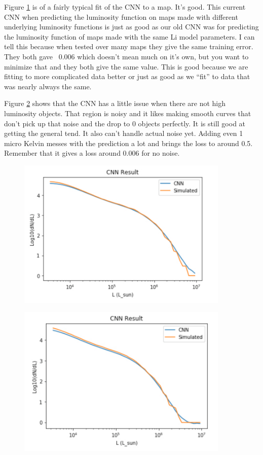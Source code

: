 \documentclass{article}
\begin{document}
		Figure \ref{fig:adam_good} is of a fairly typical fit of the CNN to a map.  It’s good.  This current CNN when predicting the luminosity function on maps made with different underlying luminosity functions is just as good as our old CNN was for predicting the luminosity function of maps made with the same Li model parameters.  I can tell this because when tested over many maps they give the same training error.  They both gave ~0.006 which doesn’t mean much on it’s own, but you want to minimize that and they both give the same value.  This is good because we are fitting to more complicated data better or just as good as we “fit” to data that was nearly always the same.

		Figure \ref{fig:adam_good_2} shows that the CNN has a little issue when there are not high luminosity objects.  That region is noisy and it likes making smooth curves that don't pick up that noise and the drop to 0 objects perfectly.  It is still good at getting the general tend.  It also can’t handle actual noise yet.  Adding even 1 micro Kelvin messes with the prediction a lot and brings the loss to around 0.5.  Remember that it gives a loss around 0.006 for no noise.

		\begin{figure}[H]
			\centering
			\includegraphics[width=0.9\textwidth]{adam_good.pdf}
			\caption{}
			\label{fig:adam_good}
		\end{figure}

		\begin{figure}[H]
			\centering
			\includegraphics[width=0.9\textwidth]{adam_good_2.pdf}
			\caption{}
			\label{fig:adam_good_2}
		\end{figure}
\end{document}
